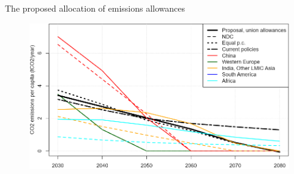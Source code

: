 \documentclass[aspectratio=169,xcolor=dvipsnames, 11pt,mathserif]{beamer}
\begin{document}
\begin{framefont}{\small}
\begin{frame}{The proposed allocation of emissions allowances}
    \begin{table}[h]
        \caption{Carbon budget over 2030--2080 (in GtCO$_\text{2}$)} \vspace{-.4cm}
      \end{table}
    \begin{figure}
        \centering %
        \includegraphics[height=.6\textheight]{../figures/policies/fossil_free_union_emission_trajectories.png} 
    \end{figure}
\end{frame}


\end{framefont}
\end{document}
